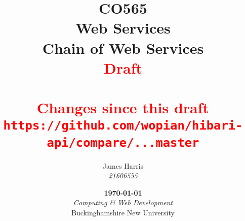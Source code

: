 \title{
  \Large CO565\\
  Web Services\\
  \vspace*{.65cm}\huge Chain of Web Services\\
  \vspace*{.65cm}\large\textcolor{red}{Draft }\\
  \textcolor{red}{\DTMnow}\\
  \vspace*{.65cm}\normalsize\textcolor{red}{Changes since this draft}\\
  \textcolor{red}{\texttt{https://github.com/wopian/hibari-api/compare/\unskip...master}}
  \vfill
}
\author{
  James Harris\\
  \textit{21606555}
}
\date{
  \vfill\textbf\today\\
  \vspace*{.75cm}\textit{Computing \& Web Development}\\
  Buckinghamshire New University
}
\maketitle
{}
